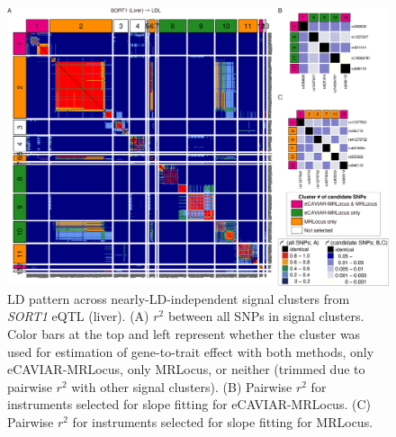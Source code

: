 \documentclass[11pt]{article}
\begin{document}
\begin{figure}[!ht]
  \centering
  \includegraphics[width=\textwidth]{figs/region/heatmap_eQTLbase.Liver_SORT1_LDL.20210114.png}
  \caption{LD pattern across nearly-LD-independent signal clusters
    from \emph{SORT1} eQTL (liver).
    (A) $r^2$ between all SNPs in signal clusters. Color bars at the
    top and left represent whether the cluster was used for estimation of
    gene-to-trait effect with both methods, only eCAVIAR-MRLocus, only
    MRLocus, or neither (trimmed due to pairwise $r^2$ with other
    signal clusters). (B) Pairwise $r^2$ for instruments selected for
    slope fitting for eCAVIAR-MRLocus. (C) Pairwise $r^2$ for
    instruments selected for slope fitting for MRLocus.}
\end{figure}
\end{document}
